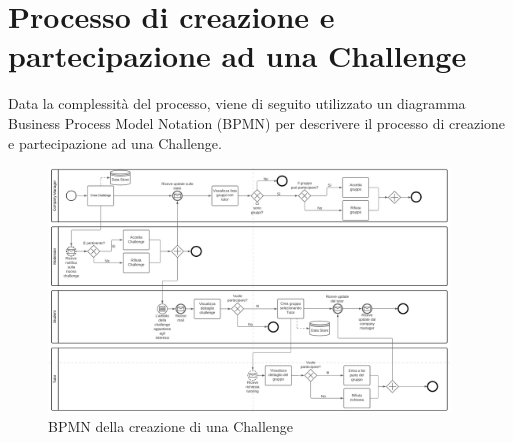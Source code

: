 \section{Processo di creazione e partecipazione ad una Challenge}

Data la complessità del processo, viene di seguito utilizzato un diagramma Business Process Model Notation (BPMN) per descrivere il processo di creazione e partecipazione ad una Challenge. 

\begin{figure}[ht]
    \centering
        \includegraphics[width=0.95\textwidth]{images/BPMN_Challenge.png}
    \caption{BPMN della creazione di una Challenge}
    \label{fig:BPMN_Challenge}
\end{figure}

\clearpage
